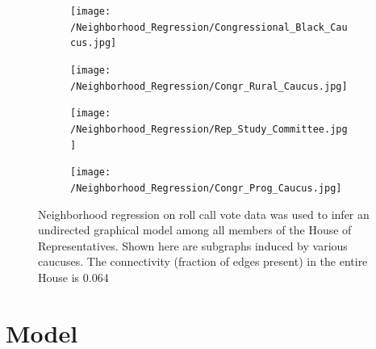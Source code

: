 \documentclass{article}
\begin{document}
\begin{figure}[h]
  \centering
    \begin{subfigure}[b]{0.49\textwidth}
        \texttt{[image: /Neighborhood\_Regression/Congressional\_Black\_Caucus.jpg]}
        \caption{}
    \end{subfigure}
          \begin{subfigure}[b]{0.49\textwidth}
        \texttt{[image: /Neighborhood\_Regression/Congr\_Rural\_Caucus.jpg]}
        \caption{}
    \end{subfigure}
        \begin{subfigure}[b]{0.49\textwidth}
        \texttt{[image: /Neighborhood\_Regression/Rep\_Study\_Committee.jpg]}
        \caption{}
    \end{subfigure}
          \begin{subfigure}[b]{0.49\textwidth}
        \texttt{[image: /Neighborhood\_Regression/Congr\_Prog\_Caucus.jpg]}
        \caption{}
    \end{subfigure}
  \caption{Neighborhood regression on roll call vote data was used to infer an undirected graphical model  among all members of the House of Representatives. Shown here are subgraphs induced by various caucuses. The connectivity (fraction of edges present) in the entire House is 0.064}
      \label{fig:Nhood_Caucus}
\end{figure}


\section{Model}
\label{model}
\end{document}
